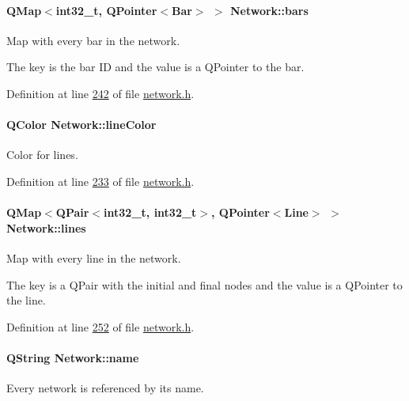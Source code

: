 \paragraph[{bars}]{\setlength{\rightskip}{0pt plus 5cm}Q\+Map$<$int32\+\_\+t, Q\+Pointer$<${\bf Bar}$>$ $>$ Network\+::bars}\label{class_network_ae37a8418e42adf765b143cdc9d992b6c}
Map with every bar in the network.

The key is the bar I\+D and the value is a Q\+Pointer to the bar. 

Definition at line \hyperlink{network_8h_source_l00242}{242} of file \hyperlink{network_8h_source}{network.\+h}.

\hypertarget{class_network_a453db7f1a994603fe4d38ac5899eb09c}{}
\paragraph[{line\+Color}]{\setlength{\rightskip}{0pt plus 5cm}Q\+Color Network\+::line\+Color}\label{class_network_a453db7f1a994603fe4d38ac5899eb09c}
Color for lines. 

Definition at line \hyperlink{network_8h_source_l00233}{233} of file \hyperlink{network_8h_source}{network.\+h}.

\hypertarget{class_network_a49659f95d02baf087707c5a94fa23d90}{}
\paragraph[{lines}]{\setlength{\rightskip}{0pt plus 5cm}Q\+Map$<$Q\+Pair$<$int32\+\_\+t, int32\+\_\+t$>$, Q\+Pointer$<${\bf Line}$>$ $>$ Network\+::lines}\label{class_network_a49659f95d02baf087707c5a94fa23d90}
Map with every line in the network.

The key is a Q\+Pair with the initial and final nodes and the value is a Q\+Pointer to the line. 

Definition at line \hyperlink{network_8h_source_l00252}{252} of file \hyperlink{network_8h_source}{network.\+h}.

\hypertarget{class_network_ab6643733a517f930c60b06f5ffd78186}{}
\paragraph[{name}]{\setlength{\rightskip}{0pt plus 5cm}Q\+String Network\+::name}\label{class_network_ab6643733a517f930c60b06f5ffd78186}
Every network is referenced by its name. 

